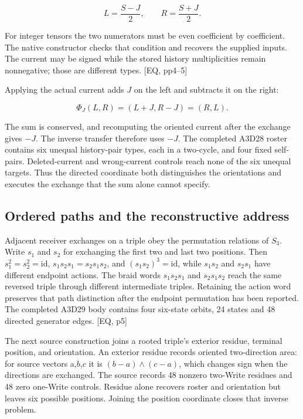 \[
L=\frac{S-J}{2},\qquad R=\frac{S+J}{2}.
\]

For integer tensors the two numerators must be even coefficient by coefficient. The native constructor checks that condition and recovers the supplied inputs. The current may be signed while the stored history multiplicities remain nonnegative; those are different types. {[}EQ, pp4--5{]}

Applying the actual current adds \(J\) on the left and subtracts it on the right:

\[
\Phi_J(L,R)=(L+J,R-J)=(R,L).
\]

The sum is conserved, and recomputing the oriented current after the exchange gives \(-J\). The inverse transfer therefore uses \(-J\). The completed A3D28 roster contains six unequal history-pair types, each in a two-cycle, and four fixed self-pairs. Deleted-current and wrong-current controls reach none of the six unequal targets. Thus the directed coordinate both distinguishes the orientations and executes the exchange that the sum alone cannot specify.

\subsection{Ordered paths and the reconstructive address}\label{ordered-paths-and-the-reconstructive-address}

Adjacent receiver exchanges on a triple obey the permutation relations of \(S_3\). Write \(s_1\) and \(s_2\) for exchanging the first two and last two positions. Then \(s_1^2=s_2^2=\mathrm{id}\), \(s_1s_2s_1=s_2s_1s_2\), and \((s_1s_2)^3=\mathrm{id}\), while \(s_1s_2\) and \(s_2s_1\) have different endpoint actions. The braid words \(s_1s_2s_1\) and \(s_2s_1s_2\) reach the same reversed triple through different intermediate triples. Retaining the action word preserves that path distinction after the endpoint permutation has been reported. The completed A3D29 body contains four six-state orbits, 24 states and 48 directed generator edges. {[}EQ, p5{]}

The next source construction joins a rooted triple's exterior residue, terminal position, and orientation. An exterior residue records oriented two-direction area: for source vectors a,\(b\),\(c\) it is \((b-a)\wedge(c-a)\), which changes sign when the directions are exchanged. The source records 48 nonzero two-Write residues and 48 zero one-Write controls. Residue alone recovers roster and orientation but leaves six possible positions. Joining the position coordinate closes that inverse problem.


